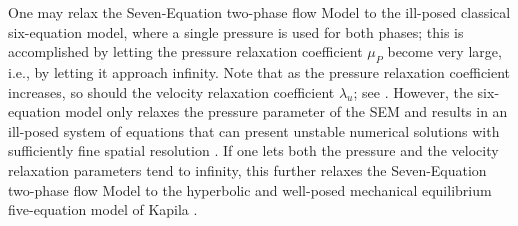 \documentclass[preprint,10pt]{elsarticle}
\begin{document}
One may relax the Seven-Equation two-phase flow Model to
the ill-posed classical six-equation model, where a single pressure 
is used for both phases; this is
accomplished by letting the pressure relaxation coefficient $\mu_P$ become
very large, i.e., by letting it approach infinity.  Note that as the pressure
relaxation coefficient increases, so should the velocity
relaxation coefficient $\lambda_u$; see . 
However, the six-equation model only relaxes the pressure parameter of the SEM and results
in an ill-posed system of equations that can present unstable numerical solutions
with sufficiently fine spatial resolution \cite{SEM,Herrard_2005}. 
%
If one lets both the pressure and the velocity relaxation parameters tend to infinity, this further relaxes the
Seven-Equation two-phase flow Model to the hyperbolic and well-posed 
mechanical equilibrium five-equation model of Kapila \cite{Kapila_2001}.  
\end{document}
